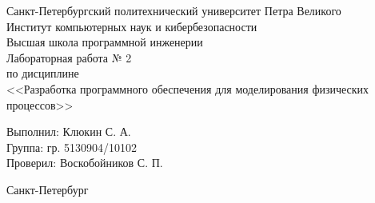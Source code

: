 \begin{titlepage}	%

	\begin{center}		%

		\large Санкт-Петербургский политехнический университет Петра Великого\\
		\large Институт компьютерных наук и кибербезопасности\\
		\large Высшая школа программной инженерии \\[6cm]

    \huge Лабораторная работа № 2\\[0.5cm] %
		\large по дисциплине\\[0.1cm]
		\large <<Разработка программного обеспечения для моделирования физических процессов>>

	\end{center}

		\noindent\large Выполнил: \hfill \large Клюкин С. А.\\
		\noindent\large Группа: \hfill \large гр. 5130904/10102\\

		\noindent\large Проверил: \hfill \large Воскобойников С. П.

	\vfill %

	\begin{center}
	\large Санкт-Петербург\\
	\large \the\year %
	\end{center} %

\end{titlepage} %

\vfill %
